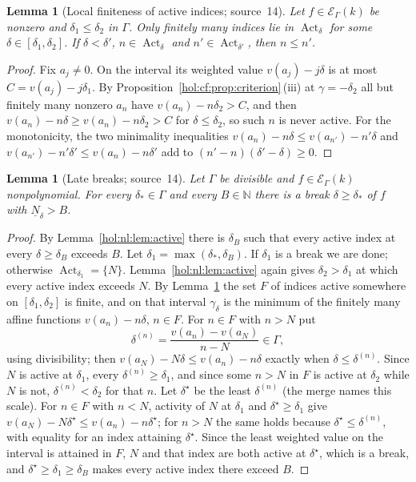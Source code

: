 \documentclass[11pt]{article}
\numberwithin{equation}{section}
\newtheorem{lemma}[theorem]{Lemma}
\theoremstyle{definition}
\theoremstyle{remark}
\newcommand{\N}{\mathbb N}
\newcommand{\EK}{\mathcal E_\Gamma(k)}
\begin{document}
\begin{lemma}[Local finiteness of active indices; source~14]
\label{hol:ot:lem:localfinite}
Let $f\in\EK$ be nonzero and $\delta_1\le\delta_2$ in $\Gamma$. Only finitely
many indices lie in $\operatorname{Act}_\delta$ for some
$\delta\in[\delta_1,\delta_2]$. If $\delta<\delta'$, $n\in\operatorname{Act}_\delta$
and $n'\in\operatorname{Act}_{\delta'}$, then $n\le n'$.
\end{lemma}

\begin{proof}
Fix $a_j\ne0$. On the interval its weighted value $v(a_j)-j\delta$ is at most
$C=v(a_j)-j\delta_1$. By Proposition~\ref{hol:cf:prop:criterion}\,(iii) at
$\gamma=-\delta_2$ all but finitely many nonzero $a_n$ have
$v(a_n)-n\delta_2>C$, and then $v(a_n)-n\delta\ge v(a_n)-n\delta_2>C$ for
$\delta\le\delta_2$, so such $n$ is never active. For the monotonicity, the
two minimality inequalities $v(a_n)-n\delta\le v(a_{n'})-n'\delta$ and
$v(a_{n'})-n'\delta'\le v(a_n)-n\delta'$ add to
$(n'-n)(\delta'-\delta)\ge0$.
\end{proof}

\begin{lemma}[Late breaks; source~14]\label{hol:ot:lem:breaks}
Let $\Gamma$ be divisible and $f\in\EK$ nonpolynomial. For every $\delta_*\in\Gamma$
and every $B\in\N$ there is a break $\delta\ge\delta_*$ of $f$ with
$\underline N_\delta>B$.
\end{lemma}

\begin{proof}
By Lemma~\ref{hol:nl:lem:active} there is $\delta_B$ such that every active
index at every $\delta\ge\delta_B$ exceeds $B$. Let
$\delta_1=\max(\delta_*,\delta_B)$. If $\delta_1$ is a break we are done;
otherwise $\operatorname{Act}_{\delta_1}=\{N\}$. Lemma~\ref{hol:nl:lem:active}
again gives $\delta_2>\delta_1$ at which every active index exceeds $N$. By
Lemma~\ref{hol:ot:lem:localfinite} the set $F$ of indices active somewhere on
$[\delta_1,\delta_2]$ is finite, and on that interval $\gamma_\delta$ is the
minimum of the finitely many affine functions $v(a_n)-n\delta$, $n\in F$. For
$n\in F$ with $n>N$ put
\[
 \delta^{(n)}=\frac{v(a_n)-v(a_N)}{n-N}\in\Gamma,
\]
using divisibility; then $v(a_N)-N\delta\le v(a_n)-n\delta$ exactly when
$\delta\le\delta^{(n)}$. Since $N$ is active at $\delta_1$, every
$\delta^{(n)}\ge\delta_1$, and since some $n>N$ in $F$ is active at $\delta_2$
while $N$ is not, $\delta^{(n)}<\delta_2$ for that $n$. Let $\delta^\star$ be
the least $\delta^{(n)}$ (the merge names this scale). For $n\in F$ with
$n<N$, activity of $N$ at $\delta_1$ and $\delta^\star\ge\delta_1$ give
$v(a_N)-N\delta^\star\le v(a_n)-n\delta^\star$; for $n>N$ the same holds
because $\delta^\star\le\delta^{(n)}$, with equality for an index attaining
$\delta^\star$. Since the least weighted value on the interval is attained in
$F$, $N$ and that index are both active at $\delta^\star$, which is a break,
and $\delta^\star\ge\delta_1\ge\delta_B$ makes every active index there exceed
$B$.
\end{proof}
\end{document}
